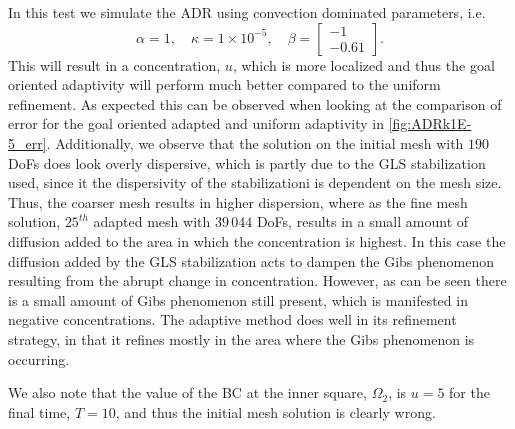 \begin{test}[Convection Dominated ADR, $\kappa = 1\times10^{-5}$] \label{tst:ADRk1E-5}
    In this test we simulate the ADR using convection dominated parameters, i.e.
    \begin{equation*}
        \alpha = 1, \quad
        \kappa = 1\times 10^{-5}, \quad
        \beta = \begin{bmatrix} -1 \\ -0.61 \end{bmatrix}.
    \end{equation*}
    This will result in a concentration, $u$, which is more localized and thus
    the goal oriented adaptivity will perform much better compared to the
    uniform refinement.  As expected this can be observed when looking at the
    comparison of error for the goal oriented adapted and uniform adaptivity in
    \autoref{fig:ADRk1E-5_err}. Additionally, we observe that the solution on
    the initial mesh with $190$ DoFs does look overly dispersive, which is
    partly due to the GLS stabilization used, since it the dispersivity of the
    stabilizationi is dependent on the mesh size. Thus, the coarser mesh results
    in higher dispersion, where as the fine mesh solution, $25^{th}$ adapted
    mesh with $39\, 044$ DoFs, results in a small amount of diffusion added to
    the area in which the concentration is highest. In this case the diffusion
    added by the GLS stabilization acts to dampen the Gibs phenomenon resulting
    from the abrupt change in concentration. However, as can be seen there is a
    small amount of Gibs phenomenon still present, which is manifested in
    negative concentrations. The adaptive method does well in its refinement
    strategy, in that it refines mostly in the area where the Gibs phenomenon
    is occurring.

    We also note that the value of the BC at the inner square, $\Omega_2$, is
    $u = 5$ for the final time, $T=10$, and thus the initial mesh solution is
    clearly wrong.


\end{test}
